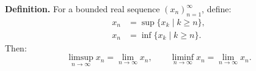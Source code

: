 \textbf{Definition.} For a bounded real sequence $(x_n)_{n=1}^{\infty}$, define:
\begin{align}
x_n &= \sup\{x_k \mid k \geq n\}, \\
x_n &= \inf\{x_k \mid k \geq n\}.
\end{align}
Then:
\[
\limsup_{n \to \infty} x_n = \lim_{n \to \infty} x_n, \qquad
\liminf_{n \to \infty} x_n = \lim_{n \to \infty} x_n.
\]
